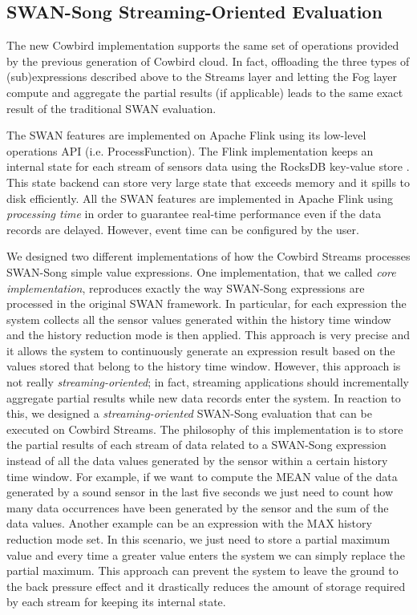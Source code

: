 \subsection{SWAN-Song Streaming-Oriented Evaluation}
The new Cowbird implementation supports the same set of operations provided by the previous generation of Cowbird cloud. In fact, offloading the three types of (sub)expressions described above to the Streams layer and letting the Fog layer compute and aggregate the partial results (if applicable) leads to the same exact result of the traditional SWAN evaluation.

The SWAN features are implemented on Apache Flink using its low-level operations API (i.e. ProcessFunction). The Flink implementation keeps an internal state for each stream of sensors data using the RocksDB key-value store \cite{rocksdbonline}. This state backend can store very large state that exceeds memory and it spills to disk efficiently. All the SWAN features are implemented in Apache Flink using \emph{processing time} in order to guarantee real-time performance even if the data records are delayed. However, event time can be configured by the user.

We designed two different implementations of how the Cowbird Streams processes SWAN-Song simple value expressions. One implementation, that we called \emph{core implementation}, reproduces exactly the way SWAN-Song expressions are processed in the original SWAN framework. In particular, for each expression the system collects all the sensor values generated within the history time window and the history reduction mode is then applied. This approach is very precise and it allows the system to continuously generate an expression result based on the values stored that belong to the history time window. However, this approach is not really \emph{streaming-oriented}; in fact, streaming applications should incrementally aggregate partial results while new data records enter the system. In reaction to this, we designed a \emph{streaming-oriented} SWAN-Song evaluation that can be executed on Cowbird Streams. The philosophy of this implementation is to store the partial results of each stream of data related to a SWAN-Song expression instead of all the data values generated by the sensor within a certain history time window. For example, if we want to compute the MEAN value of the data generated by a sound sensor in the last five seconds we just need to count how many data occurrences have been generated by the sensor and the sum of the data values. Another example can be an expression with the MAX history reduction mode set. In this scenario, we just need to store a partial maximum value and every time a greater value enters the system we can simply replace the partial maximum. This approach can prevent the system to leave the ground to the back pressure effect and it drastically reduces the amount of storage required by each stream for keeping its internal state. 

